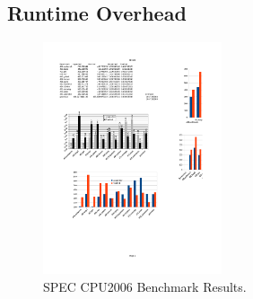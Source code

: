 %
%
%
%
%

\subsection{Runtime Overhead}
\label{section:typeshieldoverheadperformance}
\begin{figure}[h!]
    \centering
    \includegraphics[width=0.47\textwidth]{figures/spec_cpu2006.pdf}
    \caption{SPEC CPU2006 Benchmark Results.
    }
    \label{fig:awesome_image}
\end{figure}


